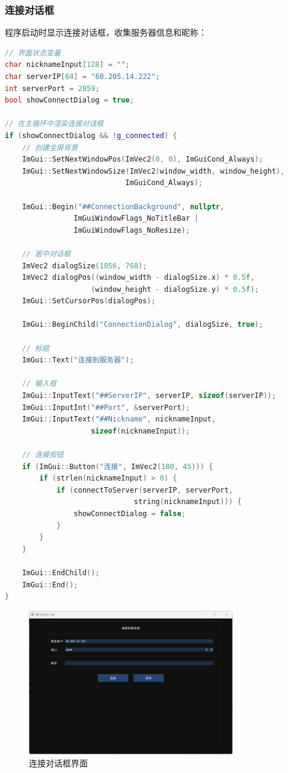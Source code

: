 \documentclass[12pt, a4paper]{article}
\begin{document}
\subsubsection{连接对话框}

程序启动时显示连接对话框，收集服务器信息和昵称：

\begin{lstlisting}[language=c++]
// 界面状态变量
char nicknameInput[128] = "";
char serverIP[64] = "60.205.14.222";
int serverPort = 2059;
bool showConnectDialog = true;

// 在主循环中渲染连接对话框
if (showConnectDialog && !g_connected) {
    // 创建全屏背景
    ImGui::SetNextWindowPos(ImVec2(0, 0), ImGuiCond_Always);
    ImGui::SetNextWindowSize(ImVec2(window_width, window_height), 
                            ImGuiCond_Always);
    
    ImGui::Begin("##ConnectionBackground", nullptr, 
                ImGuiWindowFlags_NoTitleBar | 
                ImGuiWindowFlags_NoResize);
    
    // 居中对话框
    ImVec2 dialogSize(1056, 768);
    ImVec2 dialogPos((window_width - dialogSize.x) * 0.5f, 
                    (window_height - dialogSize.y) * 0.5f);
    ImGui::SetCursorPos(dialogPos);
    
    ImGui::BeginChild("ConnectionDialog", dialogSize, true);
    
    // 标题
    ImGui::Text("连接到服务器");
    
    // 输入框
    ImGui::InputText("##ServerIP", serverIP, sizeof(serverIP));
    ImGui::InputInt("##Port", &serverPort);
    ImGui::InputText("##Nickname", nicknameInput, 
                    sizeof(nicknameInput));
    
    // 连接按钮
    if (ImGui::Button("连接", ImVec2(180, 45))) {
        if (strlen(nicknameInput) > 0) {
            if (connectToServer(serverIP, serverPort, 
                              string(nicknameInput))) {
                showConnectDialog = false;
            }
        }
    }
    
    ImGui::EndChild();
    ImGui::End();
}
\end{lstlisting}


\begin{figure}[H]
   \centering
   \includegraphics[width=0.8\textwidth]{pic/connect_dialog.png}
   \caption{连接对话框界面}
   \label{fig:connect_dialog}
\end{figure}
\end{document}
